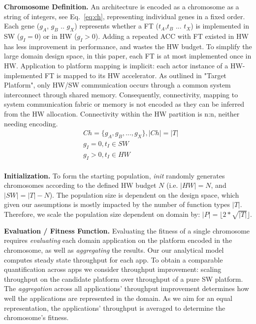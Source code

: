 \textbf{Chromosome Definition.} An architecture is encoded as a chromosome as a string of integers, see Eq.~\eqref{eq:ch}, representing individual genes in a fixed order. Each gene ($g_A$, $g_B$ .. $g_X$) represents whether a FT ($t_{A}$,$t_{B}$ ... $t_{X}$) is implemented in SW ($g_{I} = 0$) or in HW ($g_{I} > 0$). Adding a repeated ACC with FT existed in HW has less improvement in performance, and wastes the HW budget. To simplify the large domain design space, in this paper, each FT is at most implemented once in HW. Application to platform mapping is implicit: each actor instance of a HW-implemented FT is mapped to its HW accelerator.
As outlined in  "Target Platform", only HW/SW communication occurs through a common system interconnect through shared memory. Consequently, connectivity, mapping to system communication fabric or memory is not encoded as they can be inferred from the HW allocation. Connectivity within the HW partition is n:n, neither needing encoding.
%
\begin{equation}
\begin{split}
\label{eq:ch}
&Ch = \{g_A, g_B, ..., g_X \}, \left\vert{Ch}\right\vert = \left\vert{T}\right\vert \\
&g_{I} = 0, t_{I} \in SW \\
&g_{I} > 0, t_{I} \in HW \\
\end{split}
\end{equation}


\textbf{Initialization.} To form the starting population, \emph{init} randomly generates chromosomes according to the defined HW budget $N$ (i.e. $\lvert HW \rvert = N$, and $\lvert SW \rvert = \lvert T \rvert - N$). The population size is dependent on the design space, which given our assumptions is mostly impacted by the number of function types $\lvert T \rvert$. Therefore, we scale the population size dependent on domain by: $\lvert P  \rvert = \lfloor 2 * \sqrt{ \lvert T \rvert} \rfloor$.

\textbf{Evaluation / Fitness Function.} Evaluating the fitness of a single chromosome requires \emph{evaluating} each domain application on the platform encoded in the chromosome, as well as \emph{aggregating} the results. Our our analytical model  computes steady state throughput for each app. To obtain a comparable quantification across apps we consider throughput improvement: scaling throughput on the candidate platform over throughput of a pure SW platform.  The \emph{aggregation} across all applications' throughput improvement determines how well the applications are represented in the domain. As we aim for an equal representation, the applications' throughput is averaged to determine the chromosome's fitness. 

